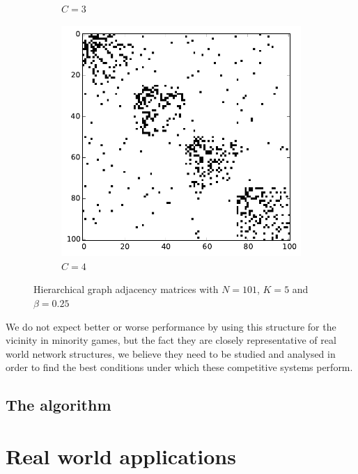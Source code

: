\begin{figure}[h]
\begin{subfigure}[b]{0.3\textwidth}
                \caption{$C=3$}
        \end{subfigure}
        \begin{subfigure}[b]{0.3\textwidth}
        	\centering
                \includegraphics[width=\textwidth]{images/topology/hierarchical_adjacency_4_dot25.pdf}
                \caption{$C=4$}
        \end{subfigure}
        \caption{Hierarchical graph adjacency matrices with $N=101$, $K=5$ and $\beta =0.25$}
        \label{fig:hierarchical adjacency graph 0.25}
\end{figure}

We do not expect better or worse performance by using this structure for the vicinity in minority games, but the fact they are closely representative of real world network structures, we believe they need to be studied and analysed in order to find the best conditions under which these competitive systems perform.

\subsection{The algorithm}
\label{subsec:algorithm}

\section{Real world applications}
\label{sec:real world}

